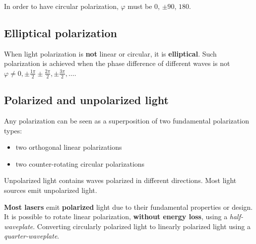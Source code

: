 In order to have circular polarization, $\varphi$ must be $0$\textdegree, $\pm 90$\textdegree, $180$\textdegree.

\subsection{Elliptical polarization}
When light polarization is \textbf{not} linear or circular, it is \textbf{elliptical}.
Such polarization is achieved when the phase difference of different waves is not $\varphi \ne 0, \pm \frac{1\pi}{2}
\pm \frac{2\pi}{2},\pm \frac{3\pi}{2}, \dots$. 

\subsection{Polarized and unpolarized light}
Any polarization can be seen as a superposition of two fundamental 
polarization types:
\begin{itemize}
    \item two orthogonal linear polarizations
    \item two counter-rotating circular polarizations
\end{itemize}

Unpolarized light contains waves polarized in different directions. Most light sources emit unpolarized light.

\textbf{Most lasers} emit \textbf{polarized} light due to their fundamental properties or design.
It is possible to rotate linear polarization, \textbf{without energy loss}, using a \textit{half-waveplate}. Converting circularly polarized light to linearly polarized light 
using a \textit{quarter-waveplate}.